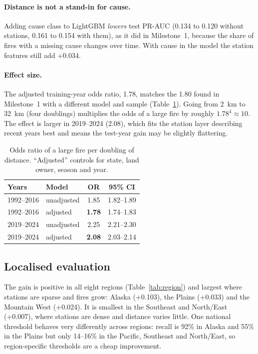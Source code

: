 \documentclass[10pt,twocolumn,letterpaper]{article}
\begin{document}
\paragraph{Distance is not a stand-in for cause.} Adding cause class to LightGBM \emph{lowers} test PR-AUC (0.134 to 0.120 without stations, 0.161 to 0.154 with them), as it did in Milestone~1, because the share of fires with a missing cause changes over time. With cause in the model the station features still add +0.034.

\paragraph{Effect size.} The adjusted training-year odds ratio, 1.78, matches the 1.80 found in Milestone~1 with a different model and sample (Table~\ref{tab:or}). Going from 2~km to 32~km (four doublings) multiplies the odds of a large fire by roughly $1.78^4\approx 10$. The effect is larger in 2019--2024 (2.08), which fits the station layer describing recent years best and means the test-year gain may be slightly flattering.

\begin{table}[!htb]
\centering\small
\caption{Odds ratio of a large fire per doubling of distance. ``Adjusted'' controls for state, land owner, season and year.}
\label{tab:or}
\begin{tabular}{@{}llcc@{}}
\toprule
Years & Model & OR & 95\% CI \\
\midrule
1992--2016 & unadjusted & 1.85 & 1.82--1.89 \\
1992--2016 & adjusted & \textbf{1.78} & 1.74--1.83 \\
2019--2024 & unadjusted & 2.25 & 2.21--2.30 \\
2019--2024 & adjusted & \textbf{2.08} & 2.03--2.14 \\
\bottomrule
\end{tabular}
\end{table}

\subsection{Localised evaluation}
The gain is positive in all eight regions (Table~\ref{tab:region}) and largest where stations are sparse and fires grow: Alaska (+0.103), the Plains (+0.033) and the Mountain West (+0.024). It is smallest in the Southeast and North/East (+0.007), where stations are dense and distance varies little. One national threshold behaves very differently across regions: recall is 92\% in Alaska and 55\% in the Plains but only 14--16\% in the Pacific, Southeast and North/East, so region-specific thresholds are a cheap improvement.
\end{document}
